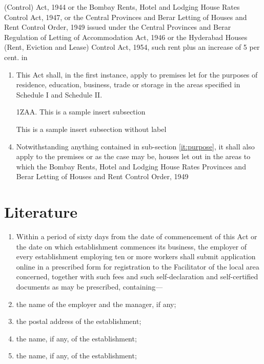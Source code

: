 \documentclass[default]{report}
\newcommand{\ins}[1]{\ul{#1}}
\newcommand{\del}[1]{\st{#1}}
\newcommand{\subs}[2]{\del{#1} \ins{#2}}
\newcommand{\lblitem}[1]{%
  \def\lblnum{#1} \item
}
\newenvironment{subsectionlist}[1][99]{%
  \begin{enumerate}[label=(\emph{\protect\lblnum)}]
    \settowidth{\leftmargin}{#1}
  }{\end{enumerate}}
\begin{document}
(Control) Act, 1944 or the Bombay Rents, Hotel and Lodging House Rates
Control Act, 1947, or the Central Provinces and Berar Letting of
Houses and Rent Control Order, 1949 issued under the Central Provinces
and Berar Regulation of Letting of Accommodation Act, 1946 or the
Hyderabad Houses (Rent, Eviction and Lease) Control Act, 1954, such
rent plus an increase of 5 per cent. in
\begin{enumerate}
\item This Act shall, in the first instance, apply to premises let for
  the purposes of residence, education, business, trade or storage in
  the areas specified in Schedule I and Schedule II.
  \label{it:purpose}
\item[1ZAA.] This is a sample insert subsection

\item[] This is a sample insert subsection without label
\item Notwithstanding anything contained in sub-section
  \ref{it:purpose}, it shall
  also apply to the premises or as the case may be, houses let out in
  the areas to which the Bombay Rents, Hotel and Lodging House Rates
  Provinces and Berar Letting of Houses and Rent Control Order, 1949

\end{enumerate}

\section{Literature}
\begin{subsectionlist}
\lblitem{1} Within a period of sixty days from the date of commencement of 
this Act or the date on which establishment commences its business, the 
employer of every establishment employing ten or more workers shall submit
application online in a prescribed form for registration to the Facilitator of
the local area concerned, together with such fees and such self-declaration
and self-certified documents as may be prescribed, containing---
\lblitem{\ins{2}} the name of the employer and the manager, if any;
\lblitem{\subs{2}{3}} the postal address of the establishment;
\lblitem{\subs{3}{4}} the name, if any, of the establishment;
\lblitem{\del{4}} the name, if any, of the establishment;
\end{subsectionlist}
\end{document}
